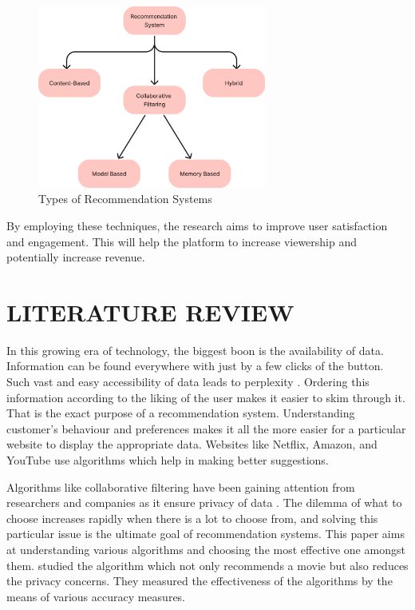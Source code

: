 \documentclass[a4paper,10pt]{article}
\begin{document}
\begin{figure}[H]
\centering
\includegraphics[height=6cm]{figures/Intro.png}
\caption{Types of Recommendation Systems}
\label{Intro}
\end{figure}

By employing these techniques, the research aims to improve user satisfaction and engagement. This will help the platform to increase viewership and potentially increase revenue.

\section{LITERATURE REVIEW}

In this growing era of technology, the biggest boon is the availability of data. Information can be found everywhere with just by a few clicks of the button. Such vast and easy accessibility of data leads to perplexity \cite{Yeole2021}. Ordering this information according to the liking of the user makes it easier to skim through it. That is the exact purpose of a recommendation system. Understanding customer's behaviour and preferences makes it all the more easier for a particular website to display the appropriate data. Websites like Netflix, Amazon, and YouTube use algorithms which help in making better suggestions. 
\vspace{4pt}

Algorithms like collaborative filtering have been gaining attention from researchers and companies as it ensure privacy of data \cite{chenna2020}. The dilemma of what to choose increases rapidly when there is a lot to choose from, and solving this particular issue is the ultimate goal of recommendation systems. This paper aims at understanding various algorithms and choosing the most effective one amongst them. \cite{chenna2020} studied the algorithm which not only recommends a movie but also reduces the privacy concerns. They measured the effectiveness of the algorithms by the means of various accuracy measures. 
\end{document}
